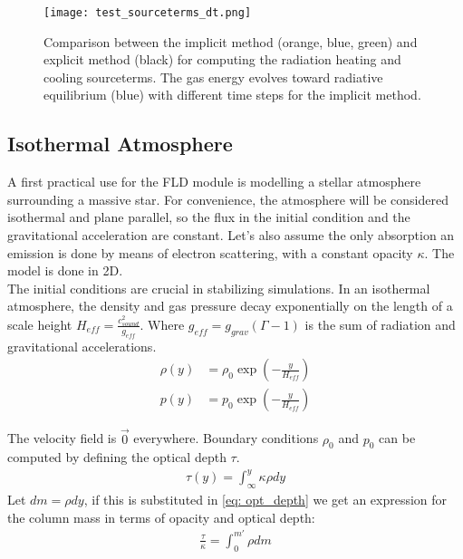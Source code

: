 \begin{figure}
\texttt{[image: test\_sourceterms\_dt.png]}
\label{fig: test_sourceterms}
\caption{Comparison between the implicit method (orange, blue, green) and explicit method (black) for computing the radiation heating and cooling sourceterms. The gas energy evolves toward radiative equilibrium (blue) with different time steps for the implicit method.}
\end{figure}

\subsection{Isothermal Atmosphere}
A first practical use for the FLD module is modelling a stellar atmosphere surrounding a massive star. For convenience, the atmosphere will be considered isothermal and plane parallel, so the flux in the initial condition and the gravitational acceleration are constant. Let's also assume the only absorption an emission is done by means of electron scattering, with a constant opacity $\kappa$. The model is done in 2D.\\

The initial conditions are crucial in stabilizing simulations. In an isothermal atmosphere, the density and gas pressure decay exponentially on the length of a scale height $H_{eff} = \frac{c_{sound}^2}{g_{eff}}$. Where $g_{eff} = g_{grav}(\Gamma - 1)$ is the sum of radiation and gravitational accelerations. 
\begin{align}
\rho(y) &= \rho_0 \exp \left( -\frac{y}{H_{eff}} \right) \\
 p(y)   &= p_0    \exp \left( -\frac{y}{H_{eff}} \right)
\end{align}

The velocity field is $\vec{0}$ everywhere. Boundary conditions $\rho_0$ and $p_0$ can be computed by defining the optical depth $\tau$. 
\begin{align}
\tau(y) = \int_\infty^{y} \kappa \rho dy  \label{eq: opt_depth}
\end{align}
Let $dm = \rho dy$, if this is substituted in \eqref{eq: opt_depth} we get an expression for the column mass in terms of opacity and optical depth:
\begin{align}
\frac{\tau}{\kappa} = \int_0^{m'} \rho dm
\end{align}


